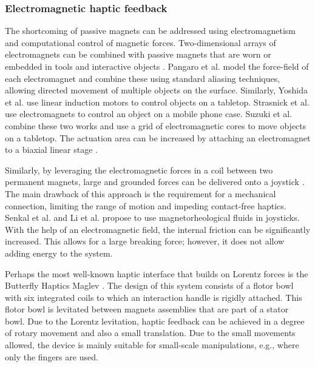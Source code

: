 \subsubsection{Electromagnetic haptic feedback}
The shortcoming of passive magnets can be addressed using electromagnetism and computational control of magnetic forces. Two-dimensional arrays of electromagnets can be combined with passive magnets that are worn \cite{weiss2011fingerflux, zhang2016magnetic, yamaoka2013depend, adel2019magnetic, berkelman2012co, berkelman2013interactive, berkelman2018electromagnetic} or embedded in tools and interactive objects \cite{ju2002origami, weiss2010madgets, Langerak:2021:Hedgehog}. Pangaro et al.\cite{pangaro2002actuated} model the force-field of each electromagnet and combine these using standard aliasing techniques, allowing directed movement of multiple objects on the surface. Similarly, Yoshida et al.\cite{yoshida2006proactive} use linear induction motors to control objects on a tabletop. Strasnick et al.\cite{strasnick2017shiftio} use electromagnets to control an object on a mobile phone case. Suzuki et al.\cite{suzuki2018reactile} combine these two works and use a grid of electromagnetic cores to move objects on a tabletop. The actuation area can be increased by attaching an electromagnet to a biaxial linear stage \cite{langerak2020magpen, langerak2019demonstration}.

Similarly, by leveraging the electromagnetic forces in a coil between two permanent magnets, large and grounded forces can be delivered onto a joystick \cite{berkelman2009extending}. The main drawback of this approach is the requirement for a mechanical connection, limiting the range of motion and impeding contact-free haptics. Senkal et al.\cite{senkal2009spherical, senkal2011haptic} and Li et al.\cite{li20072} propose to use magnetorheological fluids in joysticks. With the help of an electromagnetic field, the internal friction can be significantly increased. This allows for a large breaking force; however, it does not allow adding energy to the system.

Perhaps the most well-known haptic interface that builds on Lorentz forces is the Butterfly Haptics Maglev \cite{berkelman1996design, berkelman2000lorentz}. The design of this system consists of a flotor bowl with six integrated coils to which an interaction handle is rigidly attached. This flotor bowl is levitated between magnets assemblies that are part of a stator bowl. Due to the Lorentz levitation, haptic feedback can be achieved in a degree of rotary movement and also a small translation. Due to the small movements allowed, the device is mainly suitable for small-scale manipulations, e.g., where only the fingers are used.

